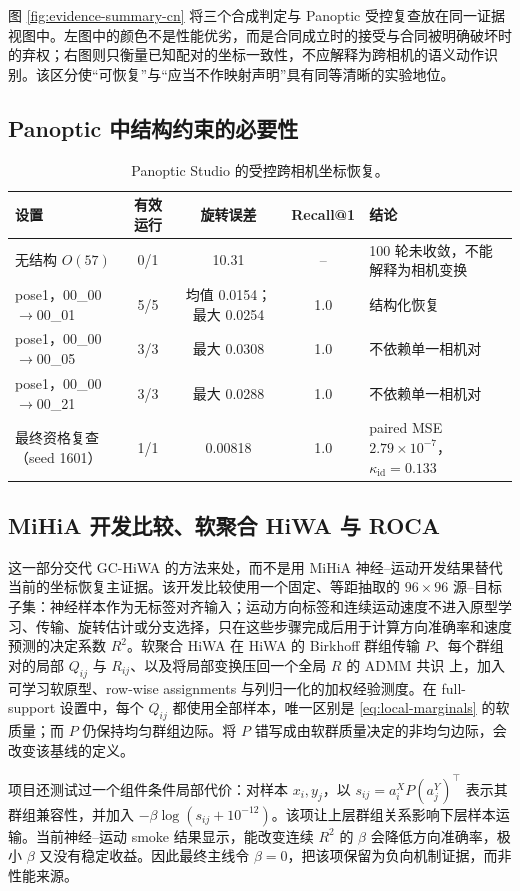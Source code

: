 \documentclass[10pt,a4paper,fontset=windows]{ctexart}
\theoremstyle{definition}
\theoremstyle{remark}
\begin{document}
图 \ref{fig:evidence-summary-cn} 将三个合成判定与 Panoptic 受控复查放在同一证据视图中。左图中的颜色不是性能优劣，而是合同成立时的接受与合同被明确破坏时的弃权；右图则只衡量已知配对的坐标一致性，不应解释为跨相机的语义动作识别。该区分使“可恢复”与“应当不作映射声明”具有同等清晰的实验地位。

\subsection{Panoptic 中结构约束的必要性}
\begin{table}[H]
\centering
\caption{Panoptic Studio 的受控跨相机坐标恢复。}
\label{tab:panoptic}
\begin{tabularx}{0.96\linewidth}{lCCC Y}
\toprule
设置 & 有效运行 & 旋转误差 & Recall@1 & 结论\\
\midrule
无结构 $O(57)$ & 0/1 & 10.31 & -- & 100 轮未收敛，不能解释为相机变换\\
pose1，00\_00$\to$00\_01 & 5/5 & 均值 0.0154；最大 0.0254 & 1.0 & 结构化恢复\\
pose1，00\_00$\to$00\_05 & 3/3 & 最大 0.0308 & 1.0 & 不依赖单一相机对\\
pose1，00\_00$\to$00\_21 & 3/3 & 最大 0.0288 & 1.0 & 不依赖单一相机对\\
最终资格复查（seed 1601） & 1/1 & 0.00818 & 1.0 & paired MSE $2.79\times10^{-7}$，$\kappa_{\mathrm{id}}=0.133$\\
\bottomrule
\end{tabularx}
\end{table}

\subsection{MiHiA 开发比较、软聚合 HiWA 与 ROCA}
这一部分交代 GC-HiWA 的方法来处，而不是用 MiHiA 神经--运动开发结果替代当前的坐标恢复主证据。该开发比较使用一个固定、等距抽取的 $96\times96$ 源--目标子集：神经样本作为无标签对齐输入；运动方向标签和连续运动速度不进入原型学习、传输、旋转估计或分支选择，只在这些步骤完成后用于计算方向准确率和速度预测的决定系数 $R^2$。软聚合 HiWA 在 HiWA 的 Birkhoff 群组传输 $P$、每个群组对的局部 $Q_{ij}$ 与 $R_{ij}$、以及将局部变换压回一个全局 $R$ 的 ADMM 共识\cite{lee2019hierarchical} 上，加入可学习软原型、row-wise assignments 与列归一化的加权经验测度。在 full-support 设置中，每个 $Q_{ij}$ 都使用全部样本，唯一区别是 \cref{eq:local-marginals} 的软质量；而 $P$ 仍保持均匀群组边际。将 $P$ 错写成由软群质量决定的非均匀边际，会改变该基线的定义。

项目还测试过一个组件条件局部代价：对样本 $x_i,y_j$，以 $s_{ij}=a_i^X P(a_j^Y)^\top$ 表示其群组兼容性，并加入 $-\beta\log(s_{ij}+10^{-12})$。该项让上层群组关系影响下层样本运输。当前神经--运动 smoke 结果显示，能改变连续 $R^2$ 的 $\beta$ 会降低方向准确率，极小 $\beta$ 又没有稳定收益。因此最终主线令 $\beta=0$，把该项保留为负向机制证据，而非性能来源。
\end{document}
